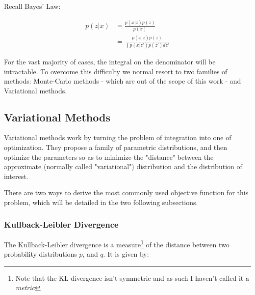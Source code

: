 Recall Bayes' Law:

\begin{align}
    p(z|x) &= \frac{p(x|z)p(z)}{p(x)} \\
           &= \frac{p(x|z)p(z)}{\int p(x|z')p(z') dz'}
\end{align}

For the vast majority of cases, the integral on the denominator will be
intractable. To overcome this difficulty we normal resort to two families
of methods: Monte-Carlo methods - which are out of the scope of this work -
and Variational methods.
%
%

\subsection{Variational Methods}
\label{subsection:variational}
Variational methods work by turning the problem of integration into one of
optimization. They propose a family of parametric distributions, and then
optimize the parameters so as to minimize the "distance" between the approximate
(normally called "variational") distribution and the distribution of interest.

There are two ways to derive the most commonly used objective function for
this problem, which will be detailed in the two following subsections.

\subsubsection{Kullback-Leibler Divergence}
\label{subsubsection:kldiv}

The Kullback-Leibler divergence is a measure\footnote{Note that the KL divergence
isn't symmetric and as such I haven't called it a \emph{metric}} of the distance
between two probability distributions $p$, and $q$. It is given by:

